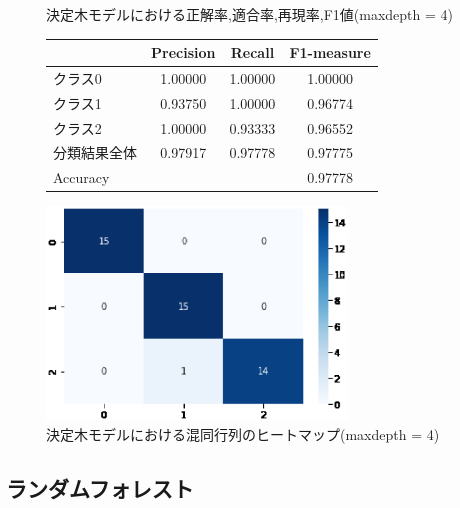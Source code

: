 \documentclass{jarticle}     %
\makeatletter
\newcommand{\tblcaption}[1]{\def\@captype{table}\caption{#1}}
\makeatother
\begin{document}
\begin{figure}[H]
  \def\@captype{table}
  \begin{minipage}[c]{.48\textwidth}
    \tblcaption{決定木モデルにおける正解率,適合率,再現率,F1値(maxdepth = 4)}
    \label{table:決定木}
    \centering
      \begin{tabular}{lccc}
        \hline
        & Precision  &  Recall &  F1-measure \\
        \hline
        クラス0  & 1.00000  & 1.00000 & 1.00000 \\
        クラス1  & 0.93750  & 1.00000 & 0.96774 \\
        クラス2  & 1.00000  & 0.93333 & 0.96552 \\
        分類結果全体  &  0.97917  &  0.97778 & 0.97775 \\
        \hline
        Accuracy & & & 0.97778\\
        \hline
      \end{tabular}
  \end{minipage}
  \hfill
  \begin{minipage}[c]{.48\textwidth}
    \includegraphics[width=80mm]{assets/tree_heatmap.eps}
    \caption{決定木モデルにおける混同行列のヒートマップ(maxdepth = 4)}
    \label{fig:決定木}
  \end{minipage}
\end{figure}

\subsection{ランダムフォレスト}
\end{document}

